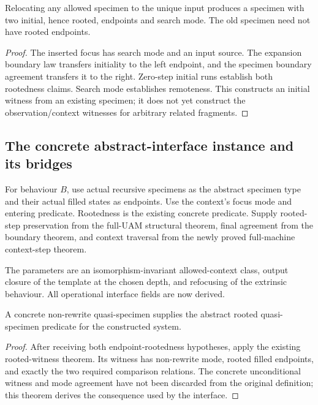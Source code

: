 

\begin{theorem}
Relocating any allowed specimen to the unique input produces a specimen with
two initial, hence rooted, endpoints and search mode. The old specimen need
not have rooted endpoints.
\end{theorem}
\begin{proof}
The inserted focus has search mode and an input source. The expansion boundary
law transfers initiality to the left endpoint, and the specimen boundary
agreement transfers it to the right. Zero-step initial runs establish both
rootedness claims. Search mode establishes remoteness. This constructs an
initial witness from an existing specimen; it does not yet construct the
observation/context witnesses for arbitrary related fragments.
\end{proof}



\subsection{The concrete abstract-interface instance and its bridges}
\begin{definition}
For behaviour $B$, use actual recursive specimens as the abstract specimen
type and their actual filled states as endpoints. Use the context's focus mode
and entering predicate. Rootedness is the existing concrete predicate. Supply
rooted-step preservation from the full-UAM structural theorem, final agreement
from the boundary theorem, and context traversal from the newly proved
full-machine context-step theorem.
\end{definition}
The parameters are an isomorphism-invariant allowed-context class,
output closure of the template at the chosen depth, and refocusing of the
extrinsic behaviour. All operational interface fields are now derived.


\begin{lemma}
A concrete non-rewrite quasi-specimen supplies the abstract rooted
quasi-specimen predicate for the constructed system.
\end{lemma}
\begin{proof}
After receiving both endpoint-rootedness hypotheses, apply the existing
rooted-witness theorem. Its witness has non-rewrite mode, rooted filled
endpoints, and exactly the two required comparison relations. The concrete
unconditional witness and mode agreement have not been discarded from the
original definition; this theorem derives the consequence used by the interface.
\end{proof}


